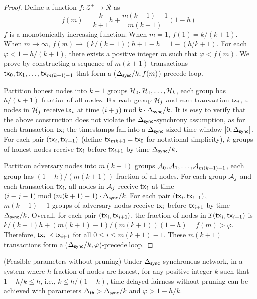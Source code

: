 \begin{proof}
    Define a function $f:\mathcal{Z}^{+}\to \mathcal{R}$ as 
    \begin{equation*}
        f(m) = \frac{k}{k+1} h + \frac{m(k+1)-1}{m(k+1)}(1-h)
    \end{equation*}
    $f$ is a monotonically increasing function. When $m=1$, $f(1)=k/(k+1)$. When $m\to \infty$, $f(m)\to (k/(k+1))h + 1-h=1-(h/k+1)$.  For each $\varphi<1-h/(k+1)$, there exists a positive integer $m$ such that $\varphi<f(m)$. We prove by constructing a sequence of $m(k+1)$ transactions $\mathsf{tx}_0, \mathsf{tx}_1, \ldots, \mathsf{tx}_{m(k+1)-1}$ that form a ($\Delta_{\mathsf{sync}}/k, f(m)$)-precede loop. 

    Partition honest nodes into $k+1$ groups $\mathcal{H}_0, \mathcal{H}_1, \ldots, \mathcal{H}_{k}$, each group has $h/(k+1)$ fraction of all nodes. For each group $\mathcal{H}_j$ and each transaction $\mathsf{tx}_i$, all nodes in $\mathcal{H}_j$ receive $\mathsf{tx}_i$ at time $(i+j)\bmod k\cdot \Delta_{\mathsf{sync}}/k$. It is easy to verify that the above construction does not violate the $\Delta_{\mathsf{sync}}$-synchrony assumption, as for each transaction $\mathsf{tx}_i$ the timestamps fall into a $\Delta_{\mathsf{sync}}$-sized time window $[0, \Delta_{\mathsf{sync}}]$. For each pair $(\mathsf{tx}_{i},\mathsf{tx}_{i+1})$ (define $\mathsf{tx}_{mk+1}=\mathsf{tx}_{0}$ for notational simplicity), $k$ groups of honest nodes receive $\mathsf{tx}_i$ before $\mathsf{tx}_{i+1}$ by time $\Delta_{\mathsf{sync}}/k$. 

    Partition adversary nodes into $m(k+1)$ groups $\mathcal{A}_0, \mathcal{A}_1, \ldots, \mathcal{A}_{m(k+1)-1}$, each group has $(1-h)/(m(k+1))$ fraction of all nodes. For each group $\mathcal{A}_j$ and each transaction $\mathsf{tx}_i$, all nodes in $\mathcal{A}_j$ receive $\mathsf{tx}_i$ at time $(i-j-1)\bmod (m(k+1)-1)\cdot \Delta_{\mathsf{sync}}/k$. For each pair $(\mathsf{tx}_{i},\mathsf{tx}_{i+1})$, $m(k+1)-1$ groups of adversary nodes receive $\mathsf{tx}_i$ before $\mathsf{tx}_{i+1}$ by time $\Delta_{\mathsf{sync}}/k$. Overall, for each pair $(\mathsf{tx}_i, \mathsf{tx}_{i+1})$, the fraction of nodes in $\mathcal{I}(\mathsf{tx}_i, \mathsf{tx}_{i+1})$ is $k/(k+1)h + (m(k+1)-1)/(m(k+1))(1-h)=f(m)>\varphi$. Therefore, $\mathsf{tx}_i\prec \mathsf{tx}_{i+1}$ for all $0\le i\le m(k+1)-1$. These $m(k+1)$ transactions form a ($\Delta_{\mathsf{sync}}/k, \varphi$)-precede loop.
\end{proof}

\begin{theorem}{(Feasible parameters without pruning)}\label{thm:feasible-no-pruning}
    Under $\Delta_{\mathsf{sync}}$-synchronous network, in a system  where $h$ fraction of nodes are honest, for any positive integer $k$ such that $1-h/k\le h$, i.e., $k\le h/(1-h)$, time-delayed-fairness without pruning can be achieved with parameters $\Delta_{\mathsf{th}}>\Delta_{\mathsf{sync}}/k$ and $\varphi>1-h/k$.
\end{theorem}



